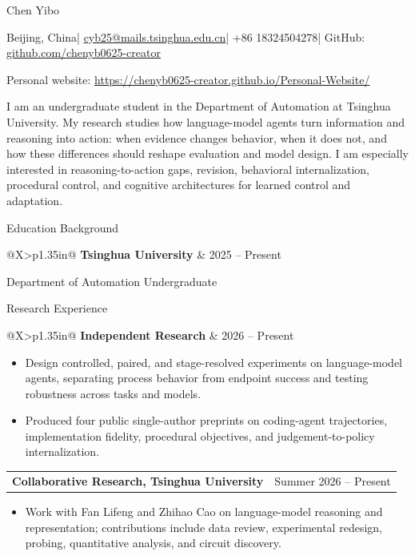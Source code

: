 \documentclass[9.6pt,a4paper]{article}
\makeatletter
\newcommand{\sectiontitle}[1]{%
  \vspace{5.5pt}%
  {\fontsize{12.8}{14.2}\selectfont\color{cvpurple}#1}\par
  \vspace{-1pt}{\color{rulepurple}\rule{\linewidth}{0.55pt}}\vspace{3.2pt}
}
\newcommand{\entryrow}[2]{%
  \begin{tabularx}{\linewidth}{@{}X>{\raggedleft\arraybackslash}p{1.35in}@{}}
    #1 & {\color{textgray}#2}\\
  \end{tabularx}
}
\makeatother
\begin{document}
{\fontsize{26.5}{29}\selectfont Chen Yibo}\par\vspace{5pt}
{\fontsize{8.65}{10.3}\selectfont\color{textgray}
Beijing, China\quad |\quad
\href{mailto:cyb25@mails.tsinghua.edu.cn}{cyb25@mails.tsinghua.edu.cn}\quad |\quad
+86 18324504278\quad |\quad
GitHub: \href{https://github.com/chenyb0625-creator}{github.com/chenyb0625-creator}
}\par\vspace{4pt}
{\fontsize{8.65}{10.3}\selectfont\color{textgray}
Personal website: \href{https://chenyb0625-creator.github.io/Personal-Website/}{https://chenyb0625-creator.github.io/Personal-Website/}
}\par\vspace{6pt}

\colorbox{softpurple}{%
  \parbox{\dimexpr\linewidth-2\fboxsep\relax}{%
    \vspace{1pt}\fontsize{8.85}{12.0}\selectfont\justifying
    I am an undergraduate student in the Department of Automation at Tsinghua University. My research studies how language-model agents turn information and reasoning into action: when evidence changes behavior, when it does not, and how these differences should reshape evaluation and model design. I am especially interested in reasoning-to-action gaps, revision, behavioral internalization, procedural control, and cognitive architectures for learned control and adaptation.
    \vspace{2pt}%
  }%
}

\sectiontitle{Education Background}
\entryrow{\textbf{Tsinghua University}}{2025 -- Present}
\vspace{1pt}
{\color{textgray}Department of Automation \textperiodcentered{} Undergraduate}\par

\sectiontitle{Research Experience}
\entryrow{\textbf{Independent Research}}{2026 -- Present}
\vspace{2pt}
\begin{itemize}[leftmargin=1.05em,itemsep=0.5pt,topsep=0.5pt]
  \item Design controlled, paired, and stage-resolved experiments on language-model agents, separating process behavior from endpoint success and testing robustness across tasks and models.
  \item Produced four public single-author preprints on coding-agent trajectories, implementation fidelity, procedural objectives, and judgement-to-policy internalization.
\end{itemize}
\vspace{0pt}
\entryrow{\textbf{Collaborative Research, Tsinghua University}}{Summer 2026 -- Present}
\vspace{2pt}
\begin{itemize}[leftmargin=1.05em,itemsep=0.5pt,topsep=0.5pt]
  \item Work with Fan Lifeng and Zhihao Cao on language-model reasoning and representation; contributions include data review, experimental redesign, probing, quantitative analysis, and circuit discovery.
\end{itemize}
\end{document}
